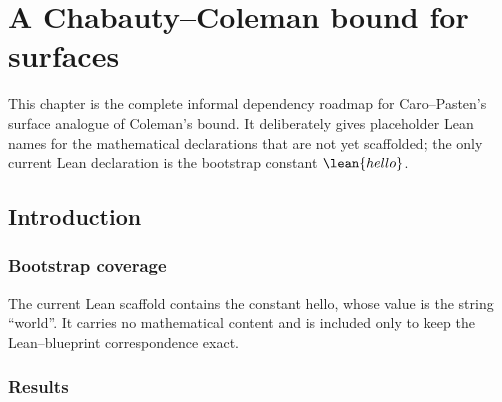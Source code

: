 \chapter{A Chabauty--Coleman bound for surfaces}


This chapter is the complete informal dependency roadmap for Caro--Pasten's
surface analogue of Coleman's bound.  It deliberately gives placeholder Lean
names for the mathematical declarations that are not yet scaffolded; the only
current Lean declaration is the bootstrap constant \(\lean{hello}\).

\section{Introduction}

\subsection{Bootstrap coverage}

\begin{definition}
  \label{def:bootstrap_hello}
  The current Lean scaffold contains the constant \(\mathrm{hello}\), whose
  value is the string ``world''.  It carries no mathematical content and is
  included only to keep the Lean--blueprint correspondence exact.
\end{definition}

\subsection{Results}


